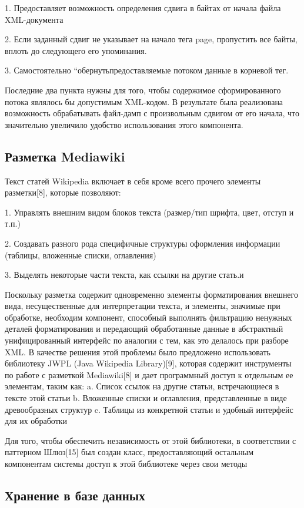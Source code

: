 1. Предоставляет возможность определения сдвига в байтах от начала файла XML-документа

2. Если заданный сдвиг не указывает на начало тега page, пропустить все байты, 
вплоть до следующего его упоминания.

3. Самостоятельно “обернутьпредоставляемые потоком данные в корневой тег.

Последние два пункта нужны для того, чтобы содержимое сформированного потока являлось бы допустимым XML-кодом.
В результате была реализована возможность обрабатывать файл-дамп с произвольным
сдвигом от его начала, что значительно увеличило удобство использования этого компонента.  

\subsection{Разметка Mediawiki}

Текст статей Wikipedia включает в себя кроме всего прочего элементы разметки[8], которые позволяют:

1. Управлять внешним видом блоков текста (размер/тип шрифта, цвет, отступ и т.п.)

2. Создавать разного рода специфичные структуры оформления информации (таблицы, вложенные списки, оглавления)

3. Выделять некоторые части текста, как ссылки на другие стать.и

Поскольку разметка содержит одновременно элементы форматирования внешнего вида,
несущественные для интерпретации текста, и элементы, значимые при обработке,
необходим компонент, способный выполнять фильтрацию ненужных деталей форматирования
и передающий обработанные данные в абстрактный унифицированный интерфейс по аналогии с тем, как это делалось при разборе XML.
В качестве решения этой проблемы было предложено использовать библиотеку 
JWPL (Java Wikipedia Library)[9], которая содержит инструменты по работе с разметкой 
Mediawiki[8] и дает программный доступ к отдельным ее элементам, таким как:
a. Список ссылок на другие статьи, встречающиеся в тексте этой статьи
b. Вложенные списки и оглавления, представленные в виде древообразных структур
c. Таблицы из конкретной статьи и удобный интерфейс для их обработки

Для того, чтобы обеспечить независимость от этой библиотеки, в соответствии
с паттерном Шлюз[15] был создан класс, предоставляющий остальным компонентам системы
доступ к этой библиотеке через свои методы

\subsection{Хранение в базе данных}

